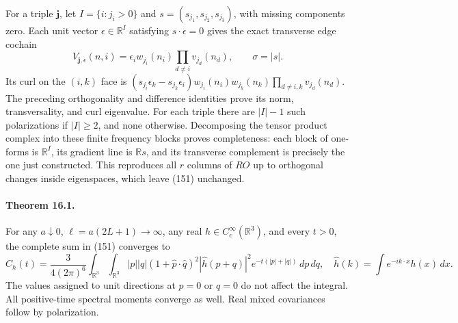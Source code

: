 \documentclass[11pt]{article}
\begin{document}
For a triple $\boldsymbol j$, let $I=\{i:j_i>0\}$ and
$s=(s_{j_1},s_{j_2},s_{j_3})$, with missing components zero. Each unit
vector $\epsilon\in\mathbb R^I$ satisfying $s\cdot\epsilon=0$
gives the exact transverse edge cochain
\begin{equation}\label{eq:full-mode-cochain}
 V_{\boldsymbol j,\epsilon}(n,i)
   =\epsilon_i w_{j_i}(n_i)\prod_{d\ne i}v_{j_d}(n_d),
 \qquad \sigma=|s|.
\end{equation}
Its curl on the $(i,k)$ face is
$(s_{j_i}\epsilon_k-s_{j_k}\epsilon_i)
w_{j_i}(n_i)w_{j_k}(n_k)\prod_{d\ne i,k}v_{j_d}(n_d)$.
The preceding orthogonality and difference identities prove its norm,
transversality, and curl eigenvalue. For each triple there are $|I|-1$
such polarizations if $|I|\ge2$, and none otherwise. Decomposing the
tensor product complex into these finite frequency blocks proves
completeness: each block of one-forms is $\mathbb R^I$, its gradient
line is $\mathbb Rs$, and its transverse complement is precisely the
one just constructed. This reproduces all $r$ columns of $RO$ up to
orthogonal changes inside eigenspaces, which leave
(151) unchanged.

\paragraph{Theorem 16.1.}
For any $a\downarrow0$, $\ell=a(2L+1)\longrightarrow\infty$, any
real $h\in C_c^\infty(\mathbb R^3)$, and every $t>0$, the complete
sum in (151) converges to
\begin{equation}\label{eq:full-momentum-integral}
 C_h(t)=\frac{3}{4(2\pi)^6}
 \int_{\mathbb R^3}\int_{\mathbb R^3}
 |p||q|(1+\widehat p\cdot\widehat q)^2
 |\widehat h(p+q)|^2 e^{-t(|p|+|q|)}\,dp\,dq,
 \quad \widehat h(k)=\int e^{-ik\cdot x}h(x)\,dx.
\end{equation}
The values assigned to unit directions at $p=0$ or $q=0$ do not
affect the integral. All positive-time spectral moments converge as
well. Real mixed covariances follow by polarization.
\end{document}
